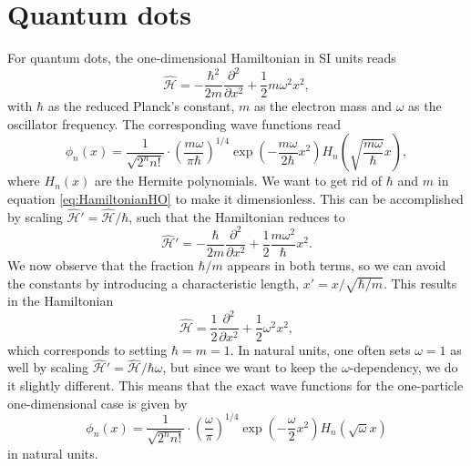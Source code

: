 \section{Quantum dots}
For quantum dots, the one-dimensional Hamiltonian in SI units reads
\begin{equation}
\hat{\mathcal{H}}=-\frac{\hbar^2}{2m}\frac{\partial^2}{\partial x^2}+\frac{1}{2}m\omega^2x^2,
\label{eq:HamiltonianHO}
\end{equation}
with $\hbar$ as the reduced Planck's constant, $m$ as the electron mass and $\omega$ as the oscillator frequency. The corresponding wave functions read
\begin{equation}
\phi_n(x)=\frac{1}{\sqrt{2^nn!}}\cdot\left(\frac{m\omega}{\pi\hbar}\right)^{1/4}\exp(-\frac{m\omega}{2\hbar}x^2)H_n\left(\sqrt{\frac{m\omega}{\hbar}}x\right),
\end{equation}
where $H_n(x)$ are the Hermite polynomials. We want to get rid of $\hbar$ and $m$ in equation \eqref{eq:HamiltonianHO} to make it dimensionless. This can be accomplished by scaling  $\hat{\mathcal{H}}'= \hat{\mathcal{H}}/\hbar$, such that the Hamiltonian reduces to
\begin{equation}
\hat{\mathcal{H}}'=-\frac{\hbar}{2m}\frac{\partial^2}{\partial x^2}+\frac{1}{2}\frac{m\omega^2}{\hbar}x^2.
\end{equation}
We now observe that the fraction $\hbar/m$ appears in both terms, so we can avoid the constants by introducing a characteristic length, $x'= x/\sqrt{\hbar/m}$. This results in the Hamiltonian 
\begin{equation}
\hat{\mathcal{H}}=\frac{1}{2}\frac{\partial^2}{\partial x^2}+\frac{1}{2}\omega^2x^2,
\end{equation}
which corresponds to setting $\hbar=m=1$. In natural units, one often sets $\omega=1$ as well by scaling $\hat{\mathcal{H}}'=\hat{\mathcal{H}}/\hbar\omega$, but since we want to keep the $\omega$-dependency, we do it slightly different. This means that the exact wave functions for the one-particle one-dimensional case is given by
\begin{equation}
\phi_n(x)=\frac{1}{\sqrt{2^nn!}}\cdot\left(\frac{\omega}{\pi}\right)^{1/4}\exp(-\frac{\omega}{2}x^2)H_n(\sqrt{\omega}x)
\end{equation} 
in natural units.

